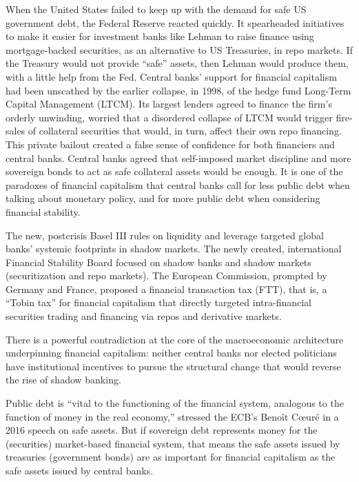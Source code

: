 \documentclass[
]{book}
\begin{document}
When the United States failed to keep up with the demand for safe US government debt, the Federal Reserve reacted quickly. It spearheaded initiatives to make it easier for investment banks like Lehman to raise finance using mortgage-backed securities, as an alternative to US Treasuries, in repo markets. If the Treasury would not provide ``safe'' assets, then Lehman would produce them, with a little help from the Fed.
Central banks' support for financial capitalism had been unscathed by the earlier collapse, in 1998, of the hedge fund Long-Term Capital Management (LTCM).
Its largest lenders agreed to finance the firm's orderly unwinding, worried that a disordered collapse of LTCM would trigger fire-sales of collateral securities that would, in turn, affect their own repo financing.
This private bailout created a false sense of confidence for both financiers and central banks.
Central banks agreed that self-imposed market discipline and more sovereign bonds to act as safe collateral assets would be enough. It is one of the paradoxes of financial capitalism that central banks call for less public debt when talking about monetary policy, and for more public debt when considering financial stability.

The new, postcrisis Basel III rules on liquidity and leverage targeted global banks' systemic footprints in shadow markets. The newly created, international Financial Stability Board focused on shadow banks and shadow markets (securitization and repo markets). The European Commission, prompted by Germany and France, proposed a financial transaction tax (FTT), that is, a ``Tobin tax'' for financial capitalism that directly targeted intra-financial securities trading and financing via repos and derivative markets.

There is a powerful contradiction at the core of the macroeconomic architecture underpinning financial capitalism: neither central banks nor elected politicians have institutional incentives to pursue the structural change that would reverse the rise of shadow banking.

Public debt is ``vital to the functioning of the financial system, analogous to the function of money in the real economy,'' stressed the ECB's Benoît Cœuré in a 2016 speech on safe assets. But if sovereign debt represents money for the (securities) market-based financial system, that means the safe assets issued by treasuries (government bonds) are as important for financial capitalism as the safe assets issued by central banks.
\end{document}
